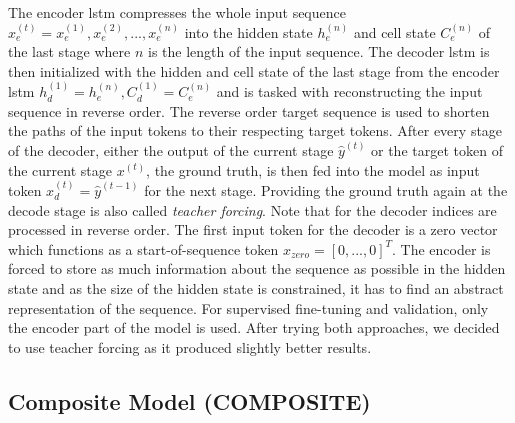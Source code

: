 The encoder \gls{lstm} compresses the whole input sequence $x_e^{(t)} = x_e^{(1)}, x_e^{(2)}, ..., x_e^{(n)}$ into the hidden state $h_e^{(n)}$ and cell state $C_e^{(n)}$ of the last stage where $n$ is the length of the input sequence. The decoder \gls{lstm} is then initialized with the hidden and cell state of the last stage from the encoder \gls{lstm} $h_d^{(1)} = h_e^{(n)}, C_d^{(1)} = C_e^{(n)}$ and is tasked with reconstructing the input sequence in reverse order. The reverse order target sequence is used to shorten the paths of the input tokens to their respecting target tokens. After every stage of the decoder, either the output of the current stage $\hat{y}^{(t)}$ or the target token of the current stage $x^{(t)}$, the ground truth, is then fed into the model as input token $x_d^{(t)} = \hat{y}^{(t-1)}$ for the next stage. Providing the ground truth again at the decode stage is also called \textit{teacher forcing}. Note that for the decoder indices are processed in reverse order. The first input token for the decoder is a zero vector which functions as a start-of-sequence token $x_{zero} = [0, ..., 0]^T$. The encoder is forced to store as much information about the sequence as possible in the hidden state and as the size of the hidden state is constrained, it has to find an abstract representation of the sequence. For supervised fine-tuning and validation, only the encoder part of the model is used. After trying both approaches, we decided to use teacher forcing as it produced slightly better results.

\FloatBarrier

\subsection{Composite Model (COMPOSITE)} \label{sec:experiments:lstm:composite}


